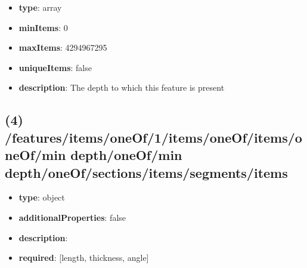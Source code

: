 \begin{itemize}[leftmargin=3em]\item {\bf type}: array
\item {\bf minItems}: 0
\item {\bf maxItems}: 4294967295
\item {\bf uniqueItems}: false
\item {\bf description}: The depth to which this feature is present
\end{itemize}\subsection{(4) /features/items/oneOf/1/items/oneOf/items/oneOf/min depth/oneOf/min depth/oneOf/sections/items/segments/items}
\begin{itemize}[leftmargin=4em]\item {\bf type}: object
\item {\bf additionalProperties}: false
\item {\bf description}: 
\item {\bf required}: [length, thickness, angle]\end{itemize}
